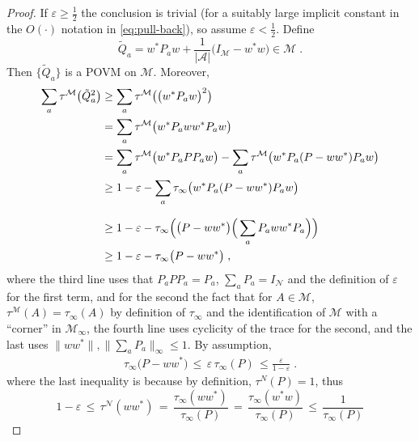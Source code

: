 \documentclass[11pt]{article}
\theoremstyle{definition}
\newcommand{\Id}{\ensuremath{I}}
\newcommand{\mA}{\ensuremath{\mathcal{A}}}
\newcommand{\mM}{\ensuremath{\mathcal{M}}}
\newcommand{\cM}{\ensuremath{\mathcal{M}}}
\newcommand{\eps}{\varepsilon}
\newcommand{\mN}{\mathcal{N}}
\begin{document}
\begin{proof}
If $\eps\geq \frac{1}{2}$ the conclusion is trivial (for a suitably large implicit constant in the $O(\cdot)$ notation in \eqref{eq:pull-back}), so assume $\eps<\frac{1}{2}$. 
Define 
\[\tilde{Q}_a = w^* P_a w  + \frac{1}{|\mA|}\big(\Id_\mM - w^* w\big) \in \mM\;.\]
Then $\{\tilde{Q}_a\}$ is a POVM on $\mM$. Moreover, 
\begin{align*}
\sum_a \tau^\mM \big( \tilde{Q}_a^2 \big) &\geq \sum_a \tau^\mM \big( \big(w^* P_a w \big)^2 \big) \\
&= \sum_a \tau^\mM \big(  w^* P_a w w^*P_a w \big)\\
&= \sum_a \tau^\mM \big(  w^* P_a  P P_a w \big) - \sum_a \tau^\mM \big( w^* P_a  ( P - w w^*) P_a w \big)\\
&\geq 1 - \eps -  \sum_a \tau_\infty \big( w^* P_a  ( P - w w^*) P_a w \big)\\
\intertext{
\hnote{I don't get this next line... how did $\tau_\infty$ show up?}\tnote{By definition, $\mM$ is seen as a sub-algebra of $\mM_\infty$, and $\tau_\infty$ restricted to that sub-algebra is $\tau^\cM$. So, whenever $M\in \mM$, $\tau^\mM(M)=\tau_\infty(\mM)$ is a legal ``shortcut'' in the writing. It's this sentence about the ``corner'' in the prelims...should we add something more explicit? Or explain this line here more, since it's the first time we make the manipulation? }\hnote{I think it would be good to add at least one line of explanation...}\tnote{added (extra line above and justification below)}
}
&\geq 1 - \eps -  \tau_\infty\Big(\big( P - w w^*\big)\Big(\sum_a  P_a w w^* P_a\Big)\Big)\\ 
&\geq 1- \eps- \tau_\infty\big( P- w w^*\big)\;,
\end{align*}
where the third line uses that $P_aPP_a=P_a$, $\sum_a P_a = \Id_\mN$ and the definition of $\eps$ for the first term, and for the second the fact that for $A\in\mM$, $\tau^\mM(A)=\tau_\infty(A)$ by definition of $\tau_\infty$ and the identification of $\mM$ with a ``corner'' in $\mM_\infty$, the fourth line uses cyclicity of the trace for the second, and the last uses $\|ww^*\|,\|\sum_a P_a\|_\infty\leq 1$. By assumption, 
\begin{align*}
\tau_\infty\big( P- w w^*\big) \,\leq\, \eps\, \tau_\infty(P)\,\leq \frac{\eps}{1-\eps}\;.
\end{align*}
where the last inequality is because by definition, $\tau^N(P)=1$, thus
\[1-\eps \,\leq\, \tau^\mN(ww^*) \,=\, \frac{\tau_\infty(ww^*)}{\tau_\infty(P)}\,=\, \frac{\tau_\infty(w^*w)}{\tau_\infty(P)}  \,\leq\, \frac{1}{\tau_\infty(P)}\]

\end{proof}
\end{document}
